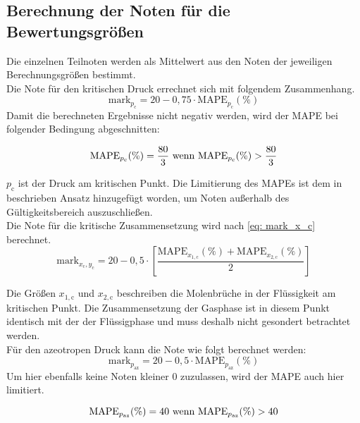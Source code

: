 \documentclass[../thesis.tex]{subfiles}
\begin{document}
\subsection{Berechnung der Noten für die Bewertungsgrößen}
Die einzelnen Teilnoten werden als Mittelwert aus den Noten der jeweiligen Berechnungsgrößen bestimmt.
\\

Die Note für den kritischen Druck errechnet sich mit folgendem Zusammenhang.
\begin{equation}
	\mathrm{mark}_{p_{\mathrm{c}}} = 20 - 0,75 \cdot \mathrm{MAPE}_{p_\mathrm{c}}(\%)
\end{equation}
Damit die berechneten Ergebnisse nicht negativ werden, wird der MAPE bei folgender Bedingung abgeschnitten:

\begin{equation}
	\notag
	\mathrm{MAPE}_{p_\mathrm{c}}(\%) = \dfrac{80}{3} \text{ wenn } \mathrm{MAPE}_{p_\mathrm{c}}(\%) > \dfrac{80}{3}
\end{equation}

$ p_\mathrm{c} $ ist der Druck am kritischen Punkt. Die Limitierung des MAPEs ist dem in \cite{jaubert2020benchmark} beschrieben Ansatz hinzugefügt worden, um Noten außerhalb des Gültigkeitsbereich auszuschließen.
\\

Die Note für die kritische Zusammensetzung wird nach \autoref{eq: mark_x_c} berechnet.
\begin{equation}
\label{eq: mark_x_c}
\mathrm{mark}_{x_\mathrm{c},y_\mathrm{c}} = 20 - 0,5 \cdot \left[
	\dfrac{\mathrm{MAPE}_{x_{1,\mathrm{c}}}(\%) + \mathrm{MAPE}_{x_{2,\mathrm{c}}}(\%)}{2}
\right]
\end{equation}

Die Größen $ x_{1,\mathrm{c}} $ und $ x_{2,\mathrm{c}} $ beschreiben die Molenbrüche in der Flüssigkeit am kritischen Punkt. Die Zusammensetzung der Gasphase ist in diesem Punkt identisch mit der der Flüssigphase und muss deshalb nicht gesondert betrachtet werden.
\\

Für den azeotropen Druck kann die Note wie folgt berechnet werden:
\begin{equation}
	\label{eq: mark_p_az}
	\mathrm{mark}_{p_{\mathrm{az}}} = 20 - 0,5 \cdot \mathrm{MAPE}_{p_\mathrm{az}}(\%)
\end{equation}
Um hier ebenfalls keine Noten kleiner 0 zuzulassen, wird der MAPE auch hier limitiert.

\begin{equation}
	\notag
	\label{eq: pheq_x_lim}
	\mathrm{MAPE}_{p_\mathrm{az}}(\%) = 40 \text{ wenn } \mathrm{MAPE}_{p_\mathrm{az}}(\%) > 40
\end{equation}
\end{document}
